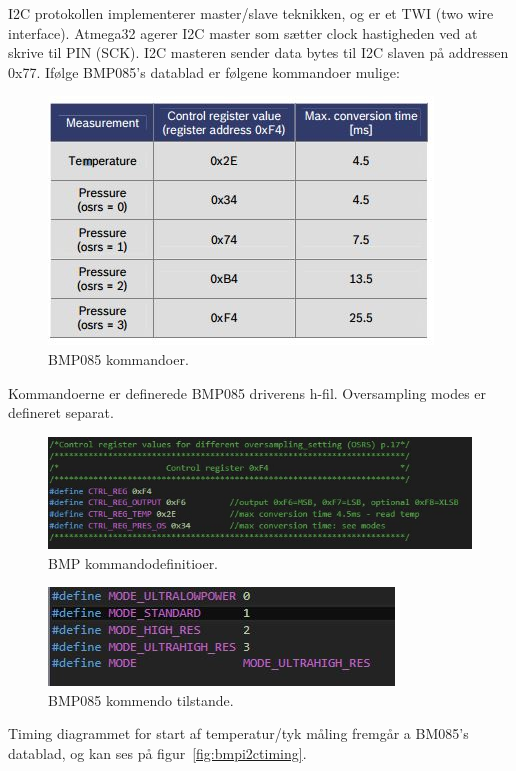 I2C protokollen implementerer master/slave teknikken, og er et TWI (two wire interface). 
Atmega32 agerer I2C master som sætter clock hastigheden ved at skrive til PIN (SCK). I2C masteren sender data bytes til I2C slaven på addressen 0x77.
Ifølge BMP085’s datablad er følgene kommandoer mulige:

\begin{figure}[h]
	\centering
	\includegraphics[width=0.6\linewidth]{figs/bmp085_commands}
	\caption{BMP085 kommandoer.}
	\label{fig:bmp085commands}
\end{figure}

Kommandoerne er definerede BMP085 driverens h-fil. Oversampling modes er defineret separat.

\begin{figure}[h]
	\centering
	\includegraphics[width=0.7\linewidth]{figs/bmp085_command_defines}
	\caption{BMP kommandodefinitioer.}
	\label{fig:bmp085commanddefines}
\end{figure}

\begin{figure}[h]
	\centering
	\includegraphics[width=0.7\linewidth]{figs/bmp085_command_modes}
	\caption{BMP085 kommendo tilstande.}
	\label{fig:bmp085commandmodes}
\end{figure}

Timing diagrammet for start af temperatur/tyk måling fremgår a BM085’s datablad, og kan ses på figur~\ref{fig:bmpi2ctiming}.

